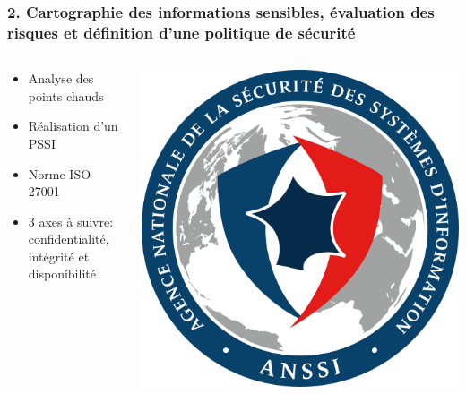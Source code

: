 \documentclass[aspectratio=169]{beamer}
\begin{document}
\begin{frame}
  \frametitle{2. Cartographie des informations sensibles, 
  évaluation des risques et définition d’une politique de sécurité}
  \begin{columns}
    \begin{column}{0.5\textwidth}
      \begin{itemize}
        \item Analyse des points chauds
        \item Réalisation d'un PSSI
        \item Norme ISO 27001
        \item 3 axes à suivre: confidentialité, intégrité et disponibilité
      \end{itemize}
    \end{column}
    \begin{column}{0.5\textwidth}
      \includegraphics[height=0.50\textheight]{Imgs/anssi.png}
    \end{column}
  \end{columns}
\end{frame}
\end{document}
